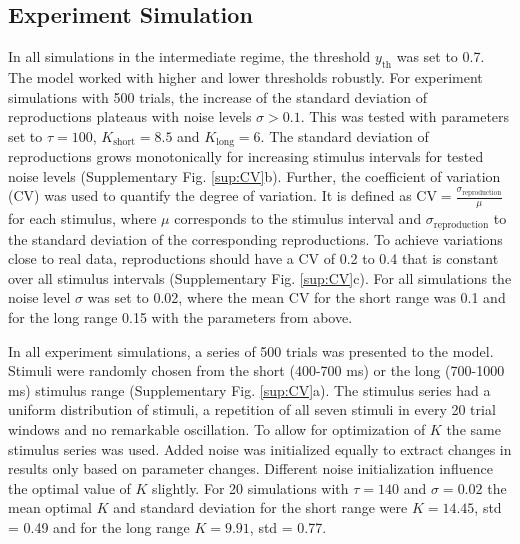 \documentclass[10pt]{article}
\begin{document}
\subsection*{Experiment Simulation}
In all simulations in the intermediate regime, the threshold $y_\text{th}$ was set to 0.7. The model worked with higher and lower thresholds robustly.  
For experiment simulations with 500 trials, the increase of the standard deviation of reproductions plateaus with noise levels $\sigma > 0.1$. This was tested with parameters set to $\tau=100$, $K_\text{short}=8.5$ and $K_\text{long}=6$.
The standard deviation of reproductions grows monotonically for increasing stimulus intervals for tested noise levels (Supplementary Fig. \ref{sup:CV}b).
Further, the coefficient of variation (CV) was used to quantify the degree of variation. It is defined as $\text{CV}=\frac{\sigma_\text{reproduction}}{\mu}$ for each stimulus, where $\mu$ corresponds to the stimulus interval and $\sigma_\text{reproduction}$ to the standard deviation of the corresponding reproductions. 
To achieve variations close to real data, reproductions should have a CV of 0.2 to 0.4 that is constant over all stimulus intervals (Supplementary Fig. \ref{sup:CV}c).
For all simulations the noise level $\sigma$ was set to 0.02, where the mean CV for the short range was 0.1 and for the long range 0.15 with the parameters from above.

In all experiment simulations, a series of 500 trials was presented to the model.
Stimuli were randomly chosen from the short (400-700 ms) or the long (700-1000 ms) stimulus range (Supplementary Fig. \ref{sup:CV}a).
The stimulus series had a uniform distribution of stimuli, a repetition of all seven stimuli in every 20 trial windows and no remarkable oscillation.
To allow for optimization of $K$ the same stimulus series was used. Added noise was initialized equally to extract changes in results only based on parameter changes.
Different noise initialization influence the optimal value of $K$ slightly. For 20 simulations with $\tau=140$ and $\sigma=0.02$ the mean optimal $K$ and standard deviation for the short range were $K = 14.45$, std = 0.49 and for the long range $K = 9.91$, std = 0.77. 
\end{document}
